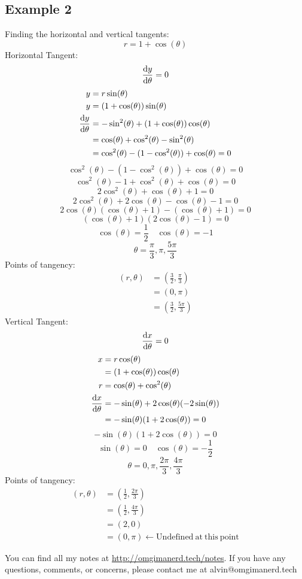 \documentclass[letterpaper, 12pt]{math}
\begin{document}
\subsection*{Example 2}
Finding the horizontal and vertical tangents:
\[ r = 1+\cos(\theta) \]
Horizontal Tangent:
\[ \frac{\mathrm{d}{y}}{\mathrm{d}{\theta}} = 0 \]
\begin{align*}
  y &= r\sin(\theta) \\
  y &= (1+\cos(\theta))\sin(\theta) \\
  \frac{\mathrm{d}{y}}{\mathrm{d}{\theta}} &=
    -\sin^{2}(\theta)+(1+\cos(\theta))\cos(\theta) \\
  &= \cos(\theta)+\cos^{2}(\theta)-\sin^{2}(\theta) \\
  &= \cos^{2}(\theta)-(1-\cos^{2}(\theta))+\cos(\theta) = 0 \\
\end{align*}
\[ \cos^{2}(\theta)-(1-\cos^{2}(\theta))+\cos(\theta) = 0 \]
\[ \cos^{2}(\theta)-1+\cos^{2}(\theta)+\cos(\theta) = 0 \]
\[ 2\cos^{2}(\theta)+\cos(\theta)+1 = 0 \]
\[ 2\cos^{2}(\theta)+2\cos(\theta)-\cos(\theta)-1 = 0 \]
\[ 2\cos(\theta)(\cos(\theta)+1)-(\cos(\theta)+1) = 0 \]
\[ (\cos(\theta)+1)(2\cos(\theta)-1) = 0 \]
\[ \cos(\theta) = \frac{1}{2} \quad \cos(\theta) = -1 \]
\[ \theta = \frac{\pi}{3},\pi,\frac{5\pi}{3} \]
Points of tangency:
\begin{align*}
  (r,\theta) &= (\frac{3}{2},\frac{\pi}{3}) \\
  &= (0,\pi) \\
  &= (\frac{3}{2},\frac{5\pi}{3})
\end{align*}
Vertical Tangent:
\[ \frac{\mathrm{d}{x}}{\mathrm{d}{\theta}} = 0 \]
\begin{align*}
  x &= r\cos(\theta) \\
  &= (1+\cos(\theta))\cos(\theta) \\
  r &= \cos(\theta)+\cos^{2}(\theta) \\
  \frac{\mathrm{d}{x}}{\mathrm{d}{\theta}} &=
    -\sin(\theta)+2\cos(\theta)(-2\sin(\theta)) \\
  &= -\sin(\theta)(1+2\cos(\theta)) = 0
\end{align*}
\[ -\sin(\theta)(1+2\cos(\theta)) = 0 \]
\[ \sin(\theta) = 0 \quad \cos(\theta) = -\frac{1}{2} \]
\[ \theta = 0,\pi,\frac{2\pi}{3},\frac{4\pi}{3} \]
Points of tangency:
\begin{align*}
  (r,\theta) &= (\frac{1}{2},\frac{2\pi}{3}) \\
  &= (\frac{1}{2},\frac{4\pi}{3}) \\
  &= (2,0) \\
  &= (0,\pi) \leftarrow \mathrm{Undefined\ at\ this\ point}
\end{align*}

\begin{center}
  You can find all my notes at \url{http://omgimanerd.tech/notes}. If you have
  any questions, comments, or concerns, please contact me at
  alvin@omgimanerd.tech
\end{center}
\end{document}
